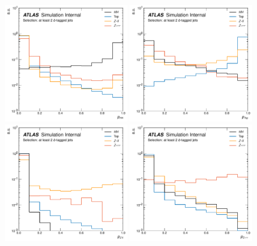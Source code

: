 \begin{figure}[!htb]
    \begin{center}
        \includegraphics[width=0.48\textwidth]{figures/search_hh/nn_disc/pi_plot_NN_p_hh}
        \includegraphics[width=0.48\textwidth]{figures/search_hh/nn_disc/pi_plot_NN_p_top}
        \includegraphics[width=0.48\textwidth]{figures/search_hh/nn_disc/pi_plot_NN_p_zsf}
        \includegraphics[width=0.48\textwidth]{figures/search_hh/nn_disc/pi_plot_NN_p_ztt}

\end{center}
\end{figure}
